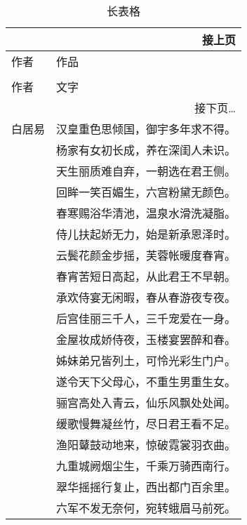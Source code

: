 \begin{longtable}{ll}
    \multicolumn{2}{r}{接上页} \\  %
    \toprule
    作者 & 作品 \\
    \midrule
    \endhead
    \caption{长表格} \\    %
    \toprule
    作者 & 文字 \\
    \midrule
    \endfirsthead
    \bottomrule
    \multicolumn{2}{r}{接下页\dots} \\     %
    \endfoot
    \bottomrule
    \endlastfoot
    白居易 & 汉皇重色思倾国，御宇多年求不得。 \\
    & 杨家有女初长成，养在深闺人未识。 \\
    & 天生丽质难自弃，一朝选在君王侧。 \\
    & 回眸一笑百媚生，六宫粉黛无颜色。 \\
    & 春寒赐浴华清池，温泉水滑洗凝脂。 \\
    & 侍儿扶起娇无力，始是新承恩泽时。 \\
    & 云鬓花颜金步摇，芙蓉帐暖度春宵。 \\
    & 春宵苦短日高起，从此君王不早朝。 \\
    & 承欢侍宴无闲暇，春从春游夜专夜。 \\
    & 后宫佳丽三千人，三千宠爱在一身。 \\
    & 金屋妆成娇侍夜，玉楼宴罢醉和春。 \\
    & 姊妹弟兄皆列土，可怜光彩生门户。 \\
    & 遂令天下父母心，不重生男重生女。 \\
    & 骊宫高处入青云，仙乐风飘处处闻。 \\
    & 缓歌慢舞凝丝竹，尽日君王看不足。 \\
    & 渔阳鼙鼓动地来，惊破霓裳羽衣曲。 \\
    & 九重城阙烟尘生，千乘万骑西南行。 \\
    & 翠华摇摇行复止，西出都门百余里。 \\
    & 六军不发无奈何，宛转蛾眉马前死。 \\

\end{longtable}
